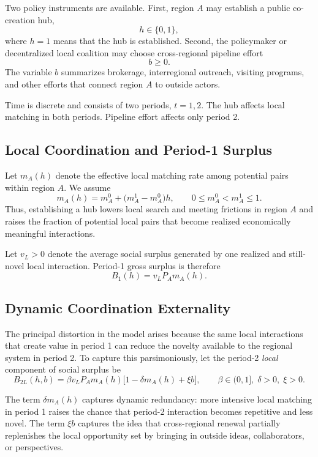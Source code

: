 Two policy instruments are available. First, region $A$ may establish a public co-creation hub,
\[
h\in\{0,1\},
\]
where $h=1$ means that the hub is established. Second, the policymaker or decentralized local coalition may choose cross-regional pipeline effort
\[
b\ge 0.
\]
The variable $b$ summarizes brokerage, interregional outreach, visiting programs, and other efforts that connect region $A$ to outside actors.

Time is discrete and consists of two periods, $t=1,2$. The hub affects local matching in both periods. Pipeline effort affects only period 2.

\subsection{Local Coordination and Period-1 Surplus}

Let $m_A(h)$ denote the effective local matching rate among potential pairs within region $A$. We assume
\begin{equation}
m_A(h)=m_A^0+\bigl(m_A^1-m_A^0\bigr)h,
\qquad
0\le m_A^0<m_A^1\le 1.
\label{eq:matching_rate}
\end{equation}
Thus, establishing a hub lowers local search and meeting frictions in region $A$ and raises the fraction of potential local pairs that become realized economically meaningful interactions.

Let $v_L>0$ denote the average social surplus generated by one realized and still-novel local interaction. Period-1 gross surplus is therefore
\begin{equation}
B_1(h)=v_L P_A m_A(h).
\label{eq:B1}
\end{equation}

\subsection{Dynamic Coordination Externality}

The principal distortion in the model arises because the same local interactions that create value in period 1 can reduce the novelty available to the regional system in period 2. To capture this parsimoniously, let the period-2 \emph{local} component of social surplus be
\begin{equation}
B_{2L}(h,b)
=
\beta v_L P_A m_A(h)\bigl[1-\delta m_A(h)+\xi b\bigr],
\qquad
\beta\in(0,1],\;
\delta>0,\;
\xi>0.
\label{eq:B2_local}
\end{equation}

The term $\delta m_A(h)$ captures dynamic redundancy: more intensive local matching in period 1 raises the chance that period-2 interaction becomes repetitive and less novel. The term $\xi b$ captures the idea that cross-regional renewal partially replenishes the local opportunity set by bringing in outside ideas, collaborators, or perspectives.

